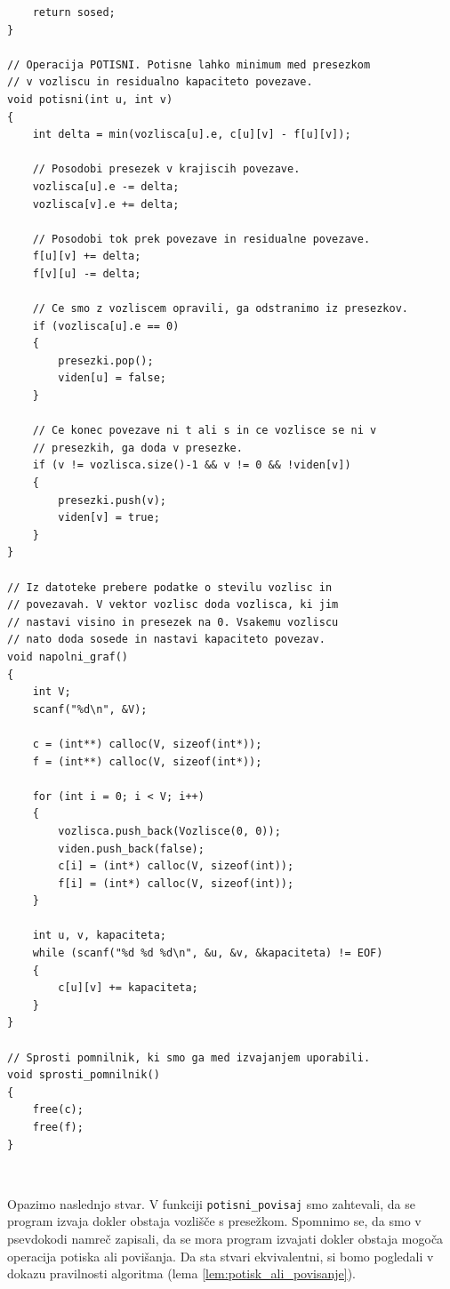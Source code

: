 \documentclass[mat1]{fmfdelo}
\begin{document}
\begin{verbatim}
    return sosed;
}

// Operacija POTISNI. Potisne lahko minimum med presezkom
// v vozliscu in residualno kapaciteto povezave.
void potisni(int u, int v)
{
    int delta = min(vozlisca[u].e, c[u][v] - f[u][v]);

    // Posodobi presezek v krajiscih povezave.
    vozlisca[u].e -= delta;
    vozlisca[v].e += delta;

    // Posodobi tok prek povezave in residualne povezave.
    f[u][v] += delta;
    f[v][u] -= delta;

    // Ce smo z vozliscem opravili, ga odstranimo iz presezkov.
    if (vozlisca[u].e == 0)
    {
        presezki.pop();
        viden[u] = false;
    }

    // Ce konec povezave ni t ali s in ce vozlisce se ni v
    // presezkih, ga doda v presezke.
    if (v != vozlisca.size()-1 && v != 0 && !viden[v])
    {
        presezki.push(v);
        viden[v] = true;
    }
}

// Iz datoteke prebere podatke o stevilu vozlisc in
// povezavah. V vektor vozlisc doda vozlisca, ki jim
// nastavi visino in presezek na 0. Vsakemu vozliscu
// nato doda sosede in nastavi kapaciteto povezav.
void napolni_graf()
{
    int V;
    scanf("%d\n", &V);

    c = (int**) calloc(V, sizeof(int*));
    f = (int**) calloc(V, sizeof(int*));

    for (int i = 0; i < V; i++)
    {
        vozlisca.push_back(Vozlisce(0, 0));
        viden.push_back(false);
        c[i] = (int*) calloc(V, sizeof(int));
        f[i] = (int*) calloc(V, sizeof(int));
    }

    int u, v, kapaciteta;
    while (scanf("%d %d %d\n", &u, &v, &kapaciteta) != EOF)
    {
        c[u][v] += kapaciteta;
    }
}

// Sprosti pomnilnik, ki smo ga med izvajanjem uporabili.
void sprosti_pomnilnik()
{
    free(c);
    free(f);
}

\end{verbatim}~


Opazimo naslednjo stvar. V funkciji \texttt{potisni\_povisaj} smo zahtevali, da se program izvaja dokler obstaja vozlišče s presežkom. Spomnimo se, da smo v psevdokodi namreč zapisali, da se mora program izvajati dokler obstaja mogoča operacija potiska ali povišanja. Da sta stvari ekvivalentni, si bomo pogledali v dokazu pravilnosti algoritma (lema \ref{lem:potisk_ali_povisanje}).
\end{document}
